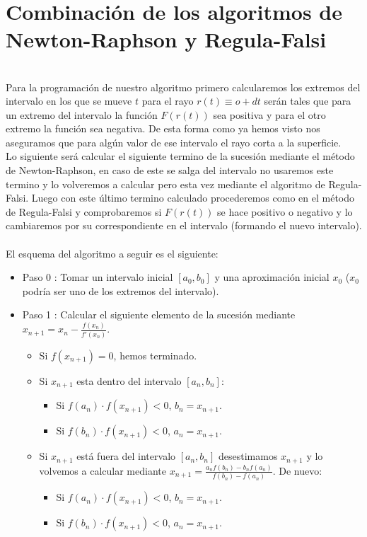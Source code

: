 ${ }$\\
\section{Combinación de los algoritmos de Newton-Raphson y Regula-Falsi}
${ }$\\

Para la programación de nuestro algoritmo primero calcularemos los extremos del intervalo en los que se mueve $t$ para el rayo $r(t) \equiv o + dt$ serán tales que para un extremo del intervalo la función $F(r(t))$ sea positiva y para el otro extremo la función sea negativa. De esta forma como ya hemos visto nos aseguramos que para algún valor de ese intervalo el rayo corta a la superficie.
${ }$\\

Lo siguiente será calcular el siguiente termino de la sucesión mediante el método de Newton-Raphson, en caso de este se salga del intervalo no usaremos este termino y lo volveremos a calcular pero esta vez mediante el algoritmo de Regula-Falsi. Luego con este último termino calculado procederemos como en el método de Regula-Falsi y comprobaremos si $F(r(t))$ se hace positivo o negativo y lo cambiaremos por su correspondiente en el intervalo (formando el nuevo intervalo).
${ }$\\

El esquema del algoritmo a seguir es el siguiente:

\begin{itemize}
	\item Paso 0 : Tomar un intervalo inicial $[a_0, b_0]$ y una aproximación inicial $x_0$ ($x_0$ podría ser uno de los extremos del intervalo).
	\item Paso 1 : Calcular el siguiente elemento de la sucesión mediante $x_{n+1} = x_n - \frac{f(x_n)}{f'(x_n)}$.
	\begin{itemize}
		\item Si $f(x_{n+1}) = 0$, hemos terminado.
		\item Si $x_{n+1}$ esta dentro del intervalo $[a_n, b_n]$:
		\begin{itemize}
			\item Si $f(a_n) \cdot f(x_{n+1}) < 0$, $b_n = x_{n+1}$.
			\item Si $f(b_n) \cdot f(x_{n+1}) < 0$, $a_n = x_{n+1}$.
		\end{itemize}
		\item Si $x_{n+1}$ está fuera del intervalo $[a_n, b_n]$ desestimamos $x_{n+1}$ y lo volvemos a calcular mediante $x_{n+1} = \frac{a_n f(b_n) - b_n f(a_n)}{f(b_n) - f(a_n)}$. De nuevo:
		\begin{itemize}
			\item Si $f(a_n) \cdot f(x_{n+1}) < 0$, $b_n = x_{n+1}$.
			\item Si $f(b_n) \cdot f(x_{n+1}) < 0$, $a_n = x_{n+1}$.
		\end{itemize}
	\end{itemize}
\end{itemize}



